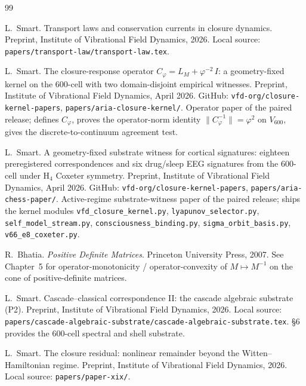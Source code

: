 \documentclass[11pt]{article}
\theoremstyle{definition}
\begin{document}

\begin{thebibliography}{99}

L.~Smart.
\newblock Transport laws and conservation currents in closure dynamics.
\newblock Preprint, Institute of Vibrational Field Dynamics, 2026.
\newblock Local source: \texttt{papers/transport-law/transport-law.tex}.

L.~Smart.
\newblock The closure-response operator $C_\varphi = L_M + \varphi^{-2}\, I$:
  a geometry-fixed kernel on the 600-cell with two domain-disjoint empirical
  witnesses.
\newblock Preprint, Institute of Vibrational Field Dynamics, April 2026.
\newblock GitHub: \texttt{vfd-org/closure-kernel-papers},
  \texttt{papers/aria-closure-kernel/}. Operator paper of the paired release;
  defines $C_\varphi$, proves the operator-norm identity $\|C_\varphi^{-1}\| = \varphi^2$
  on $V_{600}$, gives the discrete-to-continuum agreement test.

L.~Smart.
\newblock A geometry-fixed substrate witness for cortical signatures: eighteen
  preregistered correspondences and six drug/sleep EEG signatures from the
  600-cell under H$_4$ Coxeter symmetry.
\newblock Preprint, Institute of Vibrational Field Dynamics, April 2026.
\newblock GitHub: \texttt{vfd-org/closure-kernel-papers},
  \texttt{papers/aria-chess-paper/}. Active-regime substrate-witness paper of the
  paired release; ships the kernel modules \texttt{vfd\_closure\_kernel.py},
  \texttt{lyapunov\_selector.py}, \texttt{self\_model\_stream.py},
  \texttt{consciousness\_binding.py}, \texttt{sigma\_orbit\_basis.py},
  \texttt{v66\_e8\_coxeter.py}.

R.~Bhatia.
\newblock \emph{Positive Definite Matrices}.
\newblock Princeton University Press, 2007.
\newblock See Chapter~5 for operator-monotonicity / operator-convexity of
  $M \mapsto M^{-1}$ on the cone of positive-definite matrices.

L.~Smart.
\newblock Cascade--classical correspondence II: the cascade algebraic substrate ({P2}).
\newblock Preprint, Institute of Vibrational Field Dynamics, 2026.
\newblock Local source: \texttt{papers/cascade-algebraic-substrate/cascade-algebraic-substrate.tex}. \S 6 provides the $600$-cell spectral and shell substrate.

L.~Smart.
\newblock The closure residual: nonlinear remainder beyond the Witten--Hamiltonian regime.
\newblock Preprint, Institute of Vibrational Field Dynamics, 2026.
\newblock Local source: \texttt{papers/paper-xix/}.


\end{thebibliography}
\end{document}
